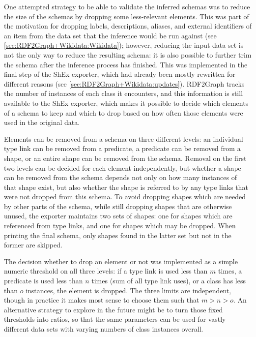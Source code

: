 One attempted strategy to be able to validate the inferred schemas %
was to reduce the size of the schemas by dropping some less-relevant elements.
This was part of the motivation for dropping labels, descriptions, aliases, and external identifiers of an item
from the data set that the inference would be run against
(see \cref{sec:RDF2Graph+Wikidata:Wikidata});
however, reducing the input data set is not the only way to reduce the resulting schema:
it is also possible to further trim the schema after the inference process has finished.
This was implemented in the final step of the ShEx exporter, %
which had already been mostly rewritten for different reasons
(see \cref{sec:RDF2Graph+Wikidata:updates}).
RDF2Graph tracks the number of instances of each class it encounters,
and this information is still available to the ShEx exporter,
which makes it possible to decide which elements of a schema to keep and which to drop
based on how often those elements were used in the original data. %


Elements can be removed from a schema on three different levels:
an individual type link can be removed from a predicate, %
a predicate can be removed from a shape,
or an entire shape can be removed from the schema.
Removal on the first two levels can be decided for each element independently,
but whether a shape can be removed from the schema depends not only on how many instances of that shape exist,
but also whether the shape is referred to by any type links that were not dropped from this schema.
To avoid dropping shapes which are needed by other parts of the schema,
while still dropping shapes that are otherwise unused,
the exporter maintains two sets of shapes:
one for shapes which are referenced from type links,
and one for shapes which may be dropped.
When printing the final schema, only shapes found in the latter set but not in the former are skipped.

The decision whether to drop an element or not
was implemented as a simple numeric threshold on all three levels:
if a type link is used less than $m$ times, %
a predicate is used less than $n$ times (sum of all type link uses),
or a class has less than $o$ instances,
the element is dropped.
The three limits are independent,
though in practice it makes most sense to choose them such that $m > n > o$.
An alternative strategy to explore in the future might be
to turn those fixed thresholds into ratios,
so that the same parameters can be used for vastly different data sets
with varying numbers of class instances overall.

